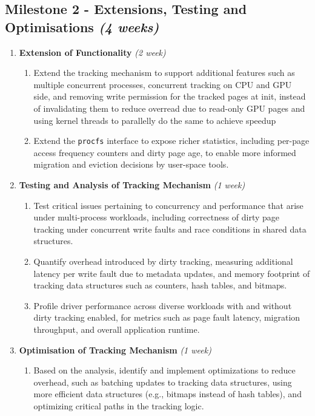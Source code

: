 \subsection*{Milestone 2 - Extensions, Testing and Optimisations \hfill \textit{(4 weeks)}}
    \begin{enumerate}
        \item \textbf{Extension of Functionality} \hfill \textit{(2 week)}
        \begin{enumerate}
            \item Extend the tracking mechanism to support additional features such as multiple concurrent processes, concurrent tracking on
            CPU and GPU side, and removing write permission for the tracked pages at init, instead of invalidating them to reduce overread
             due to read-only GPU pages and using kernel threads to parallelly do the same to achieve speedup %
            \item Extend the \texttt{procfs} interface to expose richer statistics, including per-page access 
            frequency counters and dirty page age, to enable more informed migration and eviction decisions by user-space tools.
        \end{enumerate}
        \item \textbf{Testing and Analysis of Tracking Mechanism} \hfill \textit{(1 week)}
        \begin{enumerate}
            \item Test critical issues pertaining to concurrency and performance that arise under multi-process workloads, including correctness of dirty page tracking under concurrent write faults and race conditions in shared data structures.
            \item Quantify overhead introduced by dirty tracking, measuring additional latency per write fault due to metadata updates, and memory footprint of tracking data structures such as counters, hash tables, and bitmaps.
            \item Profile driver performance across diverse workloads with and without dirty tracking enabled, for metrics such as page fault latency, migration throughput, and overall application runtime.
        \end{enumerate}
        \item \textbf{Optimisation of Tracking Mechanism} \hfill \textit{(1 week)}
        \begin{enumerate}
            \item Based on the analysis, identify and implement optimizations to reduce overhead, such as batching updates to tracking data structures, using more efficient data structures (e.g., bitmaps instead of hash tables), and optimizing critical paths in the tracking logic.
        \end{enumerate}
    \end{enumerate}

